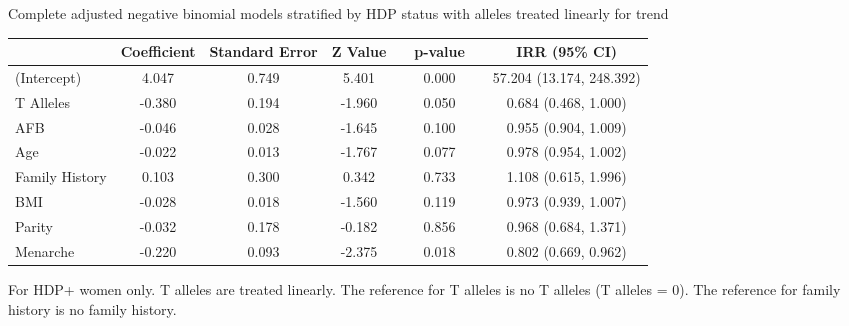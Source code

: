 \documentclass{standalone}
\begin{document}
\begin{threeparttable}
\caption{Complete adjusted negative binomial models stratified by HDP status with alleles treated linearly for trend}
\begin{tabular}{@{}lccccccc@{}}
  \toprule
 & Coefficient & Standard Error & Z Value & \hspace{1em} & p-value & \hspace{1em} & IRR (95\% CI) \\ 
  \midrule
(Intercept) & 4.047 & 0.749 & 5.401 && 0.000 && 57.204 (13.174, 248.392) \\ 
  T Alleles\phantom{abcdefghijklm} & -0.380 & 0.194 & -1.960 && 0.050 && 0.684 (0.468, 1.000) \\ 
  AFB & -0.046 & 0.028 & -1.645 && 0.100 && 0.955 (0.904, 1.009) \\ 
  Age & -0.022 & 0.013 & -1.767 && 0.077 && 0.978 (0.954, 1.002) \\ 
  Family History & 0.103 & 0.300 & 0.342 && 0.733 && 1.108 (0.615, 1.996) \\ 
  BMI & -0.028 & 0.018 & -1.560 && 0.119 && 0.973 (0.939, 1.007) \\ 
  Parity & -0.032 & 0.178 & -0.182 && 0.856 && 0.968 (0.684, 1.371) \\ 
  Menarche & -0.220 & 0.093 & -2.375 && 0.018 && 0.802 (0.669, 0.962) \\
   \bottomrule
\end{tabular}
\begin{tablenotes}
\small
\item For HDP+ women only. T alleles are treated linearly. The reference for T alleles is no T alleles (T alleles = 0). The reference for family history is no family history.
\end{tablenotes}
\end{threeparttable}
\end{document}
